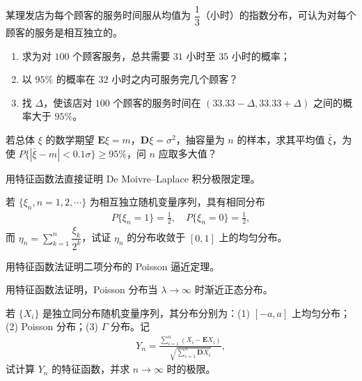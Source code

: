 \documentclass[../../main.tex]{subfiles}
\begin{document}
\begin{exercise}\label{exercise:ch05-31}
某理发店为每个顾客的服务时间服从均值为 $\dfrac13$（小时）的指数分布，可认为对每个顾客的服务是相互独立的。
\begin{enumerate}
\item 求为对 $100$ 个顾客服务，总共需要 $31$ 小时至 $35$ 小时的概率；
\item 以 $95\%$ 的概率在 $32$ 小时之内可服务完几个顾客？
\item 找 $\Delta$，使该店对 $100$ 个顾客的服务时间在 $(33.33-\Delta,33.33+\Delta)$ 之间的概率大于 $95\%$。
\end{enumerate}
\end{exercise}

\begin{exercise}\label{exercise:ch05-32}
若总体 $\xi$ 的数学期望 $\boldsymbol{E}\xi=m$，$\boldsymbol{D}\xi=\sigma^{2}$，抽容量为 $n$ 的样本，求其平均值 $\bar{\xi}$，为使 $P\{|\bar{\xi}-m|<0.1\sigma\}\geqslant95\%$，问 $n$ 应取多大值？
\end{exercise}

\begin{exercise}\label{exercise:ch05-33}
用特征函数法直接证明 De Moivre--Laplace 积分极限定理。
\end{exercise}

\begin{exercise}\label{exercise:ch05-34}
若 $\{\xi_n,n=1,2,\cdots\}$ 为相互独立随机变量序列，具有相同分布
\begin{align*}
P\{\xi_n=1\}=\frac12,\quad P\{\xi_n=0\}=\frac12,
\end{align*}
而 $\eta_n=\sum_{k=1}^{n}\dfrac{\xi_k}{2^{k}}$，试证 $\eta_n$ 的分布收敛于 $[0,1]$ 上的均匀分布。
\end{exercise}

\begin{exercise}\label{exercise:ch05-35}
用特征函数法证明二项分布的 Poisson 逼近定理。
\end{exercise}

\begin{exercise}\label{exercise:ch05-36}
用特征函数法证明，Poisson 分布当 $\lambda\to\infty$ 时渐近正态分布。
\end{exercise}

\begin{exercise}\label{exercise:ch05-37}
若 $\{X_i\}$ 是独立同分布随机变量序列，其分布分别为：(1) $[-a,a]$ 上均匀分布；(2) Poisson 分布；(3) $\Gamma$ 分布。记
\begin{align*}
Y_n=\frac{\sum_{i=1}^{n}(X_i-\boldsymbol{E}X_i)}{\sqrt{\sum_{i=1}^{n}\boldsymbol{D}X_i}},
\end{align*}
试计算 $Y_n$ 的特征函数，并求 $n\to\infty$ 时的极限。
\end{exercise}
\end{document}
